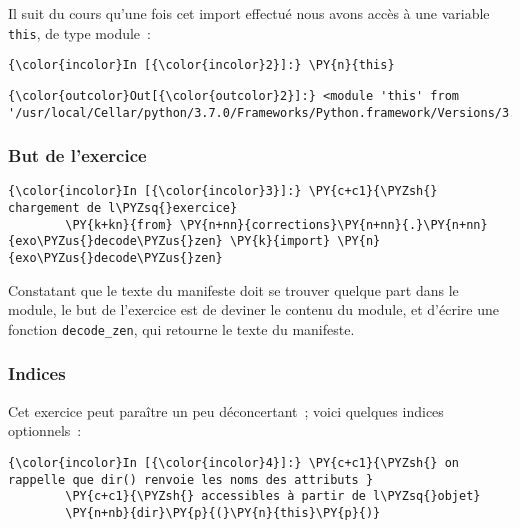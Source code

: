     Il suit du cours qu'une fois cet import effectué nous avons accès à une
variable \texttt{this}, de type module~:

    \begin{Verbatim}[commandchars=\\\{\},frame=single,framerule=0.3mm,rulecolor=\color{cellframecolor}]
{\color{incolor}In [{\color{incolor}2}]:} \PY{n}{this}
\end{Verbatim}


\begin{Verbatim}[commandchars=\\\{\},frame=single,framerule=0.3mm,rulecolor=\color{cellframecolor}]
{\color{outcolor}Out[{\color{outcolor}2}]:} <module 'this' from '/usr/local/Cellar/python/3.7.0/Frameworks/Python.framework/Versions/3.7/lib/python3.7/this.py'>
\end{Verbatim}
            
    \hypertarget{but-de-lexercice}{%
\subsubsection{But de l'exercice}\label{but-de-lexercice}}

    \begin{Verbatim}[commandchars=\\\{\},frame=single,framerule=0.3mm,rulecolor=\color{cellframecolor}]
{\color{incolor}In [{\color{incolor}3}]:} \PY{c+c1}{\PYZsh{} chargement de l\PYZsq{}exercice}
        \PY{k+kn}{from} \PY{n+nn}{corrections}\PY{n+nn}{.}\PY{n+nn}{exo\PYZus{}decode\PYZus{}zen} \PY{k}{import} \PY{n}{exo\PYZus{}decode\PYZus{}zen}
\end{Verbatim}


    Constatant que le texte du manifeste doit se trouver quelque part dans
le module, le but de l'exercice est de deviner le contenu du module, et
d'écrire une fonction \texttt{decode\_zen}, qui retourne le texte du
manifeste.

    \hypertarget{indices}{%
\subsubsection{Indices}\label{indices}}

    Cet exercice peut paraître un peu déconcertant~; voici quelques indices
optionnels~:

    \begin{Verbatim}[commandchars=\\\{\},frame=single,framerule=0.3mm,rulecolor=\color{cellframecolor}]
{\color{incolor}In [{\color{incolor}4}]:} \PY{c+c1}{\PYZsh{} on rappelle que dir() renvoie les noms des attributs }
        \PY{c+c1}{\PYZsh{} accessibles à partir de l\PYZsq{}objet}
        \PY{n+nb}{dir}\PY{p}{(}\PY{n}{this}\PY{p}{)}
\end{Verbatim}


